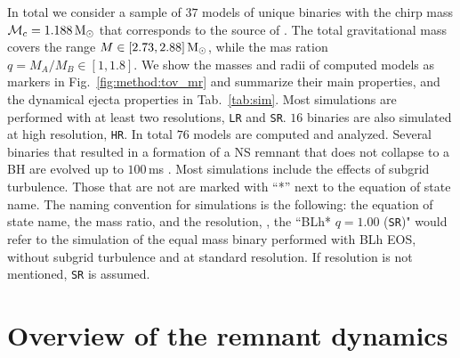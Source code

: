 In total we consider a sample of $37$ models of unique binaries with the 
chirp mass $\mathcal{M}_c = 1.188\,{\text{M}_{\odot}}$ that corresponds to the source of \GW{}.
%
The total gravitational mass covers the range $M\in[2.73, 2.88]\,{\text{M}_{\odot}}$, while the 
mas ration $q=M_A/M_B\in[1,1.8]$. 
%
We show the masses and radii of computed models as markers in 
Fig.~\ref{fig:method:tov_mr} and summarize their main properties, 
and the dynamical ejecta properties in Tab.~\ref{tab:sim}.
%
Most simulations are performed with at least two resolutions, 
\texttt{LR} and \texttt{SR}. 
$16$ binaries are also simulated at high resolution, \texttt{HR}.
In total $76$ models are computed and analyzed.
%
Several binaries that resulted in a formation of a \ac{NS} remnant that does not collapse 
to a \ac{BH} are evolved up to $100\,$ms \pmerg.
%
Most simulations include the effects of subgrid turbulence. 
Those that are not are marked with ``*'' next to the equation of state name.
%
The naming convention for simulations is the following: 
the equation of state name, the mass ratio, and the resolution, \eg, 
the ``BLh* $q=1.00$ (\texttt{SR})" would refer to the simulation of the equal mass
binary performed with BLh \ac{EOS}, without subgrid turbulence and at standard resolution. If resolution is not mentioned, \texttt{SR} is assumed.




\section{Overview of the remnant dynamics}
\label{sec:bns_dynsmics_overview}




